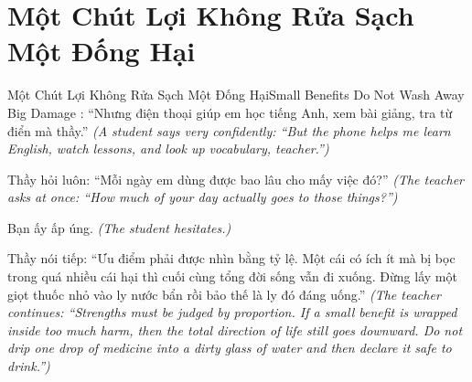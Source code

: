\section{Một Chút Lợi Không Rửa Sạch Một Đống Hại}
\begin{truyen}{Một Chút Lợi Không Rửa Sạch Một Đống Hại}{Small Benefits Do Not Wash Away Big Damage}
: ``Nhưng điện thoại giúp em học tiếng Anh, xem bài giảng, tra từ điển mà thầy.''
\textit{(A student says very confidently: ``But the phone helps me learn English, watch lessons, and look up vocabulary, teacher.'')}

Thầy hỏi luôn: ``Mỗi ngày em dùng được bao lâu cho mấy việc đó?''
\textit{(The teacher asks at once: ``How much of your day actually goes to those things?'')}

Bạn ấy ấp úng.
\textit{(The student hesitates.)}


Thầy nói tiếp: ``Ưu điểm phải được nhìn bằng tỷ lệ. Một cái có ích ít mà bị bọc trong quá nhiều cái hại thì cuối cùng tổng đời sống vẫn đi xuống. Đừng lấy một giọt thuốc nhỏ vào ly nước bẩn rồi bảo thế là ly đó đáng uống.''
\textit{(The teacher continues: ``Strengths must be judged by proportion. If a small benefit is wrapped inside too much harm, then the total direction of life still goes downward. Do not drip one drop of medicine into a dirty glass of water and then declare it safe to drink.'')}
\end{truyen}

